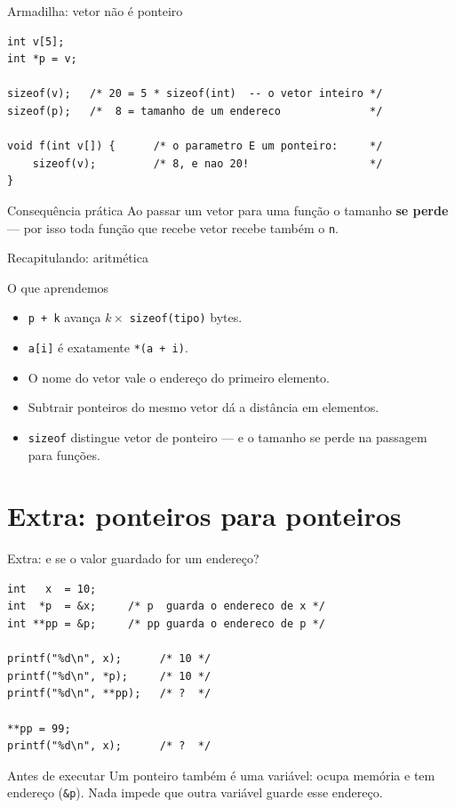 \documentclass[aspectratio=169]{beamer}
\begin{document}
\begin{frame}[fragile]{Armadilha: vetor não é ponteiro}
\begin{lstlisting}
int v[5];
int *p = v;

sizeof(v);   /* 20 = 5 * sizeof(int)  -- o vetor inteiro */
sizeof(p);   /*  8 = tamanho de um endereco              */

void f(int v[]) {      /* o parametro E um ponteiro:     */
    sizeof(v);         /* 8, e nao 20!                   */
}
\end{lstlisting}
  \begin{alertblock}{Consequência prática}
    Ao passar um vetor para uma função o tamanho \textbf{se perde} --- por isso
    toda função que recebe vetor recebe também o \texttt{n}.
  \end{alertblock}
\end{frame}

\begin{frame}{Recapitulando: aritmética}
  \begin{block}{O que aprendemos}
    \begin{itemize}
      \item \texttt{p + k} avança $k \times$ \texttt{sizeof(tipo)} bytes.
      \item \texttt{a[i]} é exatamente \texttt{*(a + i)}.
      \item O nome do vetor vale o endereço do primeiro elemento.
      \item Subtrair ponteiros do mesmo vetor dá a distância em elementos.
      \item \texttt{sizeof} distingue vetor de ponteiro --- e o tamanho se
        perde na passagem para funções.
    \end{itemize}
  \end{block}
\end{frame}

\section{Extra: ponteiros para ponteiros}

\begin{frame}[fragile]{Extra: e se o valor guardado for um endereço?}
\vspace{-2mm}
\begin{lstlisting}
int   x  = 10;
int  *p  = &x;     /* p  guarda o endereco de x */
int **pp = &p;     /* pp guarda o endereco de p */

printf("%d\n", x);      /* 10 */
printf("%d\n", *p);     /* 10 */
printf("%d\n", **pp);   /* ?  */

**pp = 99;
printf("%d\n", x);      /* ?  */
\end{lstlisting}
  \begin{block}{Antes de executar}
    Um ponteiro também é uma variável: ocupa memória e tem endereço
    (\texttt{\&p}). Nada impede que outra variável guarde esse endereço.
  \end{block}
\end{frame}
\end{document}
